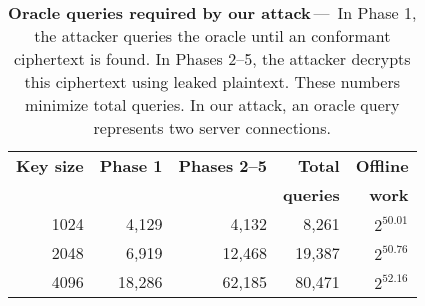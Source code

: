 \begin{table}[t]
\begin{tabular*}{\linewidth}{@{\extracolsep{\fill}\hskip\tabcolsep}rrrrr}
\toprule
\textbf{Key size}    & \textbf{Phase 1} & \textbf{Phases 2--5} & \textbf{Total}   & \textbf{Offline} \\
                     &                 &                 & \textbf{queries} & \textbf{work}    \\
\midrule
               1024 &  4,129   &  4,132  &  8,261 & $2^{50.01}$ \\

               2048 &  6,919   &  12,468 & 19,387 & $2^{50.76}$ \\

               4096 &  18,286  &  62,185 & 80,471 & $2^{52.16}$ \\
\bottomrule
\end{tabular*}
	\caption{\textbf{Oracle queries required by our attack}\,---\,%
	In Phase 1, the attacker queries the oracle until an \ssltwo conformant
	ciphertext is found. In Phases 2--5, the attacker decrypts this ciphertext
	using leaked plaintext. These numbers minimize total queries. In our attack,
	an oracle query represents two server connections.
	}
	\label{tab:optimal_queries}
\end{table}

